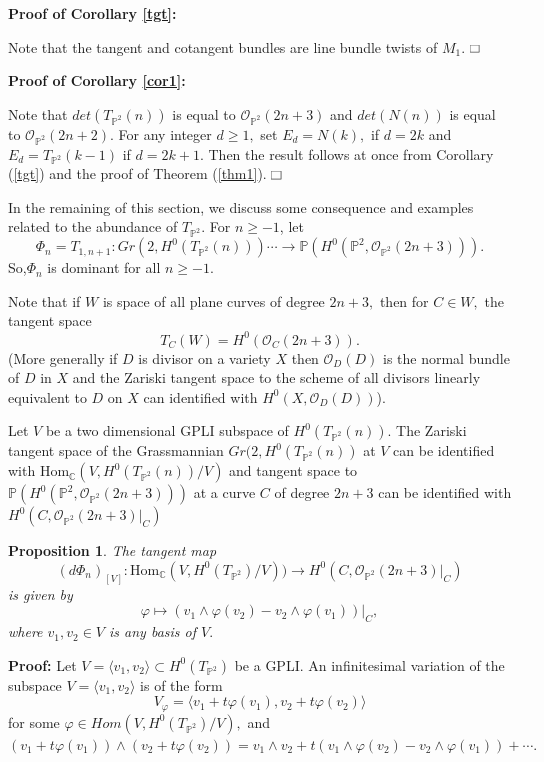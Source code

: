 \documentclass[11pt]{amsart}
\newtheorem{prop}[subsection]{Proposition}
\theoremstyle{definition}
\newcommand{\OOO}{{\mathcal O}}
\renewcommand\square{\frame{\phantom{{\large x}}}}
\begin{document}
\textbf{Proof of Corollary \ref{tgt}:}

Note that the tangent and cotangent bundles are line bundle twists of $M_1$.
$\hfill{\square}$

\textbf{Proof of Corollary \ref{cor1}:}

Note that $det (T_{\mathbb{P}^2}(n)) $ is equal to $ \OOO_{\mathbb{P}^2}(2n+3)$ and 
$det(N(n))$ is equal to $ \OOO_{\mathbb{P}^2}(2n+2).$ For any integer $d \geq 1,$ set
$E_d = N(k),$  if $d=2k$ and $E_d= T_{\mathbb{P}^2}(k-1)$ if $d=2k+1.$ Then the result
follows at once 
from Corollary (\ref{tgt}) and the proof of Theorem (\ref{thm1}). 
$\hfill{\square}$

In the remaining of this section, we discuss some consequence and examples related to
the abundance of $T_{\mathbb{P}^2}.$ For $n\geq -1$, let 
$$\Phi_n=T_{1,n+1}: Gr(2, H^0(T_{\mathbb{P}^2}(n))) \cdots\to \mathbb{P}
(H^0(\mathbb{P}^2, \OOO_{\mathbb{P}^2}(2n+3))).$$ 
So,$\Phi_n$ is dominant for all $n\geq -1.$ 

 Note that if $W$ is space of all plane  curves of degree $2n+3,$ then  for 
 $C \in W,$  the tangent space 
 $$T_{C}(W)=H^0(\mathcal O_{C}(2n+3)).$$ 
  (More generally if $D$ is divisor on a variety $X$  then $\mathcal{O}_D(D)$ 
  is the normal bundle of $D$ in $X$ and the Zariski tangent space to the scheme of 
  all divisors linearly equivalent to $D$ on $X$ can identified with 
  $H^0(X,\mathcal{O}_D(D))$).
   
Let $V$ be a two dimensional GPLI  subspace of 
 $H^0(T_{\mathbb{P}^2}(n)).$  
The Zariski tangent space of the Grassmannian 
$Gr(2, H^0(T_{\mathbb{P}^2}(n))$ at $V$ can be identified with 
$\text{Hom}_{\mathbb{C}}(V , H^0(T_{\mathbb{P}^2}(n))/V)$
and tangent space to\\ 
$\mathbb{P}(H^0(\mathbb{P}^2, \mathcal{O}_{\mathbb{P}^2}(2n+3)))$ at a
curve $C$ of degree $2n+3$ can be  identified with 
$H^0(C, \mathcal{O}_{\mathbb{P}^2}(2n+3)|_C)$
 \begin{prop}\label{tangent} The tangent map 
 $$(d\Phi_n)_{[V]} :\text{Hom}_{\mathbb{C}}(V , H^0(T_{\mathbb{P}^2})/V)) \to H^0(C, 
 \mathcal{O}_{\mathbb{P}^2}(2n+3)|_C) $$
 is given by 
 $$\varphi \mapsto (v_1 \wedge \varphi(v_2) - v_2 \wedge \varphi(v_1))|_C,$$
  where $v_1, v_2 \in V$ is any basis of $V.$
 \end{prop}
 
  {\bf Proof:} 
  Let $V =\langle v_{1},v_{2}\rangle  \subset  H^0(T_{\mathbb{P}^2}) $  be a GPLI.  
  An infinitesimal variation of the subspace 
  $V = \langle v_1, v_2\rangle $ is of the form 
  $$V_{\varphi}= \langle v_1+t\varphi(v_{1}) , v_2+t\varphi(v_{2})\rangle$$
   for some $\varphi \in Hom(V,H^0(T_{\mathbb{P}^2})/V),$  
  and $(v_{1}+t\varphi(v_{1}))\wedge(v_{2}+t\varphi(v_{2}))=v_{1}\wedge
  v_{2}+t(v_{1}\wedge \varphi(v_{2})-v_{2}\wedge \varphi(v_{1}))+\cdots.$ 
 
\end{document}
